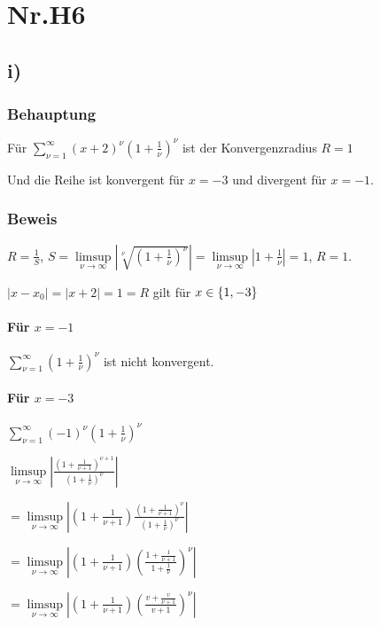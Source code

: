 \section*{Nr.H6}

\subsection*{i)}

\subsubsection*{Behauptung}

Für $\sum\limits^{\infty}_{\nu = 1} (x+2)^{\nu} (1+\frac{1}{\nu})^{\nu}$ ist der Konvergenzradius $R = 1$ 

Und die Reihe ist konvergent für $x = -3$ und divergent für $x = -1$.

\subsubsection*{Beweis}

$ R = \frac{1}{S}$,
$S = \limsup\limits_{\nu \to \infty} |\sqrt[\nu]{(1 + \frac{1}{\nu})^{\nu}}|
= \limsup\limits_{\nu \to \infty} |1 + \frac{1}{\nu}|
= 1 $,
$R = 1$.

$|x-x_{0}| = |x+2| = 1 = R$ gilt für $ x \in \{\-1,-3\}$

\paragraph*{Für $x = -1$}

$\sum\limits^{\infty}_{\nu = 1}(1+\frac{1}{\nu})^{\nu}$ ist nicht konvergent.


\paragraph*{Für $x = -3$}

$\sum\limits^{\infty}_{\nu = 1}(-1)^{\nu}(1+\frac{1}{\nu})^{\nu}$

$\limsup\limits_{\nu \to \infty} |\frac{(1+\frac{1}{\nu+1})^{\nu+1}}{(1+\frac{1}{\nu})^{\nu}}|$

$=\limsup\limits_{\nu \to \infty} |(1+\frac{1}{\nu+1})\frac{(1+\frac{1}{\nu+1})^{\nu}}{(1+\frac{1}{\nu})^{\nu}}|$

$=\limsup\limits_{\nu \to \infty} |(1+\frac{1}{\nu+1})(\frac{1+\frac{1}{\nu+1}}{1+\frac{1}{\nu}})^{\nu}|$

$=\limsup\limits_{\nu \to \infty} |(1+\frac{1}{\nu+1})(\frac{v+\frac{v}{\nu+1}}{v+1})^{\nu}|$

